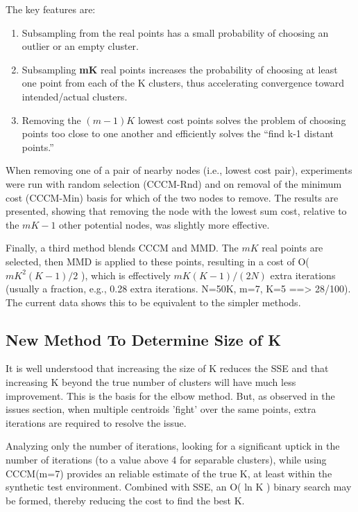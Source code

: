 \documentclass{article}
\begin{document}
The key features are:
\begin{enumerate}
\item Subsampling from the real points has a small probability of choosing an outlier or an empty cluster.
\item Subsampling \textbf{mK} real points increases the probability of choosing at least one point from each of the K clusters, thus accelerating convergence toward intended/actual clusters.
\item Removing the $(m-1)K$ lowest cost points solves the problem of choosing points too close to one another and efficiently solves the “find k-1 distant points.”
\end{enumerate}

When removing one of a pair of nearby nodes (i.e., lowest cost pair), experiments were run with random selection (CCCM-Rnd) and on removal of the minimum cost (CCCM-Min) basis for which of the two nodes to remove.  The results are presented, showing that removing the node with the lowest sum cost, relative to the $mK-1$ other potential nodes, was slightly more effective.

Finally, a third method blends CCCM and MMD.  The $mK$ real points are selected, then MMD is applied to these points, resulting in a cost of O( $mK^2(K-1)/2$ ), which is effectively $mK(K-1)/(2N)$ extra iterations (usually a fraction, e.g., 0.28 extra iterations.  N=50K, m=7, K=5 ==> 28/100).  The current data shows this to be equivalent to the simpler methods.

\subsection{New Method To Determine Size of K}

It is well understood that increasing the size of K reduces the SSE and that increasing K beyond the true number of clusters will have much less improvement.  This is the basis for the elbow method.  But, as observed in the issues section, when multiple centroids 'fight' over the same points, extra iterations are required to resolve the issue.

Analyzing only the number of iterations, looking for a significant uptick in the number of iterations (to a value above 4 for separable clusters), while using CCCM(m=7) provides an reliable estimate of the true K, at least within the synthetic test environment.  Combined with SSE, an O( ln K ) binary search may be formed, thereby reducing the cost to find the best K.
\end{document}
